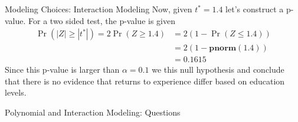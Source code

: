 \documentclass[notheorems,9pt]{beamer}
\begin{document}
\begin{frame}{Modeling Choices: Interaction Modeling} 
	\label{frame:interaction3}
	Now, given \(t^* = 1.4\) let's construct a p-value. For a two sided test, the p-value is given 
	\begin{align*}
		\Pr(|Z| \geq |t^*|) = 2\Pr(Z \geq 1.4) &= 2\left(1 - \Pr(Z\leq 1.4)\right) \\
											   &= 2\left(1 - \textbf{pnorm}(1.4)\right) \\
											   &= 0.1615
	\end{align*} 
	\onslide<2->
	Since this p-value is larger than \(\alpha = 0.1\) we  this null hypothesis and conclude that there is no evidence that returns to experience differ based on education levels.
\end{frame}
\begin{frame}{Polynomial and Interaction Modeling: Questions}
	\centering
\end{frame} 
\end{document}
